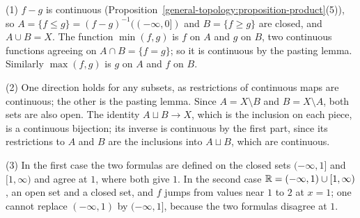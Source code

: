 \begin{solution}
(1) $f - g$ is continuous (Proposition~\ref{general-topology:proposition-product}(5)), so $A = \{f \leq g\} = (f - g)^{-1}((-\infty, 0])$ and $B = \{f \geq g\}$ are closed, and $A \cup B = X$. The function $\min(f, g)$ is
$f$ on $A$ and $g$ on $B$, two continuous functions agreeing on $A \cap B = \{f = g\}$; so it is continuous by the pasting lemma. Similarly $\max(f, g)$ is $g$ on $A$ and $f$ on $B$.

(2) One direction holds for any subsets, as restrictions of continuous maps are continuous; the other is the pasting lemma. Since $A = X \setminus B$ and $B = X \setminus A$, both sets are also open. The identity
$A \sqcup B \to X$, which is the inclusion on each piece, is a continuous bijection; its inverse is continuous by the first part, since its restrictions to $A$ and $B$ are the inclusions into $A \sqcup B$, which are continuous.

(3) In the first case the two formulas are defined on the closed sets $(-\infty, 1]$ and $[1, \infty)$ and agree at $1$, where both give $1$. In the second case $\mathbb{R} = (-\infty, 1) \cup [1, \infty)$, an open set and
a closed set, and $f$ jumps from values near $1$ to $2$ at $x = 1$; one cannot replace $(-\infty, 1)$ by $(-\infty, 1]$, because the two formulas disagree at $1$.
\end{solution}
